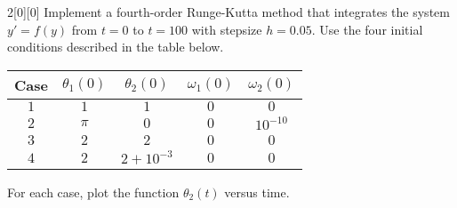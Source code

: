 \documentclass{article}
\begin{document}
\begin{hw}{2}[0][0]
Implement a fourth-order Runge-Kutta method that integrates the system $y'= f(y)$ from $t = 0$
	to $t = 100$ with stepsize $h = 0.05$. Use the four initial conditions described in the table below.

\begin{center}
	\begin{tabular}{c|c c c c}
		Case & $\theta_1(0)$ & $\theta_2(0)$ & $\omega_1(0)$ & $\omega_2(0)$ \\
		\hline
		$1$ & $1$ & $1$ & $0$ & $0$ \\
		$2$ & $\pi$ & $0$ & $0$ & $10^{-10}$ \\
		$3$ & $2$ & $2$ & $0$ & $0$ \\
		$4$ & $2$ & $2 + 10^{-3}$ & $0$ & $0$ \\
	\end{tabular}
\end{center}

For each case, plot the function $\theta_2(t)$ versus time.
\end{hw}
\end{document}
